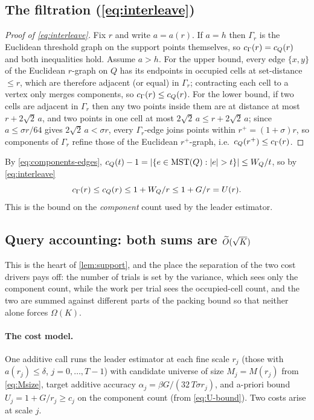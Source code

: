 \subsection{The filtration (\texorpdfstring{\eqref{eq:interleave}}{interleaving})}\label{sec:app-interleave}

\begin{proof}[Proof of \eqref{eq:interleave}]
Fix $r$ and write $a=a(r)$. If $a=h$ then $\Gamma_r$ is the Euclidean threshold graph on the support
points themselves, so $c_\Gamma(r)=c_Q(r)$ and both inequalities hold. Assume $a>h$. For the upper bound, every
edge $\{x,y\}$ of the Euclidean $r$-graph on $Q$ has its endpoints in occupied cells at set-distance
$\le r$, which are therefore adjacent (or equal) in $\Gamma_r$; contracting each cell to a vertex only
merges components, so $c_\Gamma(r)\le c_Q(r)$. For the lower bound, if two cells are adjacent in $\Gamma_r$ then
any two points inside them are at distance at most $r+2\sqrt2\,a$, and two points in one cell at most
$2\sqrt2\,a\le r+2\sqrt2\,a$; since $a\le\sigma r/64$ gives $2\sqrt2\,a<\sigma r$, every $\Gamma_r$-edge
joins points within $r^+=(1+\sigma)r$, so components of $\Gamma_r$ refine those of the Euclidean
$r^+$-graph, i.e.\ $c_Q(r^+)\le c_\Gamma(r)$.
\end{proof}

By \eqref{eq:components-edges}, $\cQ(t)-1=\abs{\{e\in\MST(Q):\abs e>t\}}\le\Wq/t$, so by \eqref{eq:interleave}
\begin{equation}\label{eq:U-bound}
  c_\Gamma(r)\le c_Q(r)\le 1+W_Q/r\le 1+G/r=U(r).
\end{equation}
This is the bound on the \emph{component} count used by the leader estimator.

\subsection{Query accounting: both sums are \texorpdfstring{$\widetilde{O}(\sqrt K)$}{O(sqrt K)}}\label{sec:app-accounting}

This is the heart of \cref{lem:support}, and the place the separation of the two cost drivers pays off:
the number of trials is set by the variance, which sees only the component count, while the work per trial
sees the occupied-cell count, and the two are summed against different parts of the packing bound so that
neither alone forces $\Omega(K)$.

\paragraph{The cost model.} One additive call runs the leader estimator at each fine scale $r_j$ (those
with $a(r_j)\le\delta$, $j=0,\dots,T-1$) with candidate universe of size $M_j=M(r_j)$ from
\eqref{eq:Msize}, target additive accuracy $\alpha_j=\beta G/(32\,T\sigma r_j)$, and a-priori bound
$U_j=1+G/r_j\ge c_j$ on the component count (from \eqref{eq:U-bound}). Two costs arise at scale $j$.

